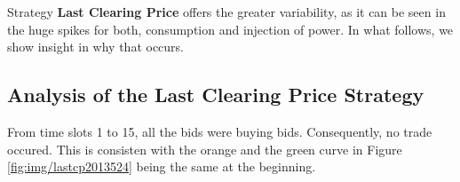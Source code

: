 \documentclass{article}
\begin{document}
Strategy \textbf{Last Clearing Price} offers the greater variability, as it can be seen in the huge spikes for both, consumption and injection of power. In what follows, we show insight in why that occurs.

\subsection{Analysis of the Last Clearing Price Strategy}

From time slots 1 to 15, all the bids were buying bids. Consequently, no trade occured. This is consisten with the orange and the green curve in Figure \ref{fig:img/lastcp2013524} being the same at the beginning.
\end{document}
